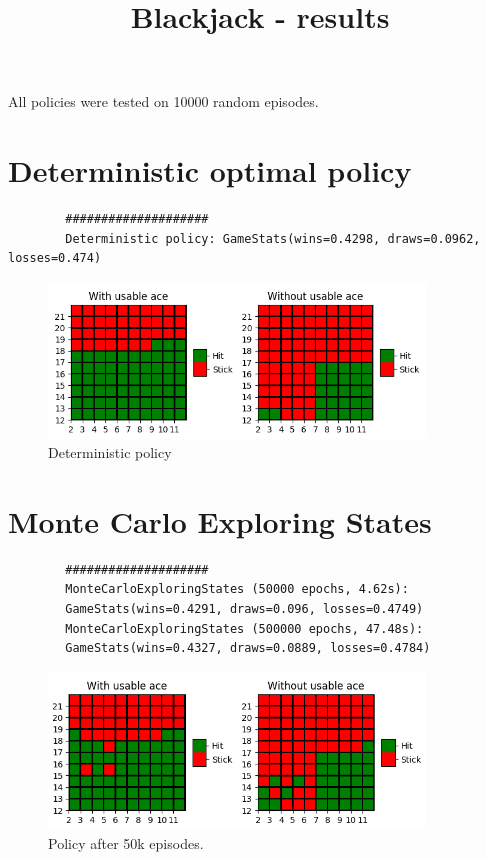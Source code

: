 \documentclass{article}
\title{Blackjack - results}
\date{}
\begin{document}
    \maketitle

    All policies were tested on 10000 random episodes.

    \section{Deterministic optimal policy}
    \begin{verbatim}
        ####################
        Deterministic policy: GameStats(wins=0.4298, draws=0.0962, losses=0.474)
    \end{verbatim}
    \begin{figure}[h]
        \centering
        \includegraphics[width=10cm]{plots/deterministic_policy.png}
        \caption{Deterministic policy}
    \end{figure}


    \section{Monte Carlo Exploring States}
    \begin{verbatim}
        ####################
        MonteCarloExploringStates (50000 epochs, 4.62s):
        GameStats(wins=0.4291, draws=0.096, losses=0.4749)
        MonteCarloExploringStates (500000 epochs, 47.48s):
        GameStats(wins=0.4327, draws=0.0889, losses=0.4784)
    \end{verbatim}

    \begin{figure}[h]
        \centering
        \includegraphics[width=10cm]{plots/mces_policy_50k.png}
        \caption{Policy after 50k episodes.}
    \end{figure}
\end{document}
